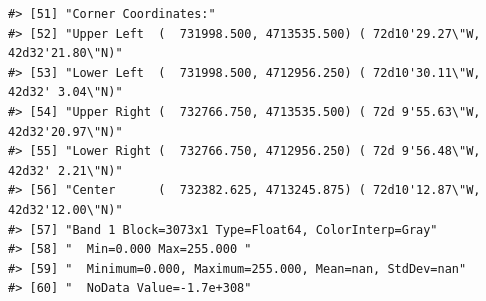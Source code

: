 \documentclass[
]{book}
\begin{document}
\begin{verbatim}
#> [51] "Corner Coordinates:"                                                                                                                                                                                                                                                            
#> [52] "Upper Left  (  731998.500, 4713535.500) ( 72d10'29.27\"W, 42d32'21.80\"N)"                                                                                                                                                                                                      
#> [53] "Lower Left  (  731998.500, 4712956.250) ( 72d10'30.11\"W, 42d32' 3.04\"N)"                                                                                                                                                                                                      
#> [54] "Upper Right (  732766.750, 4713535.500) ( 72d 9'55.63\"W, 42d32'20.97\"N)"                                                                                                                                                                                                      
#> [55] "Lower Right (  732766.750, 4712956.250) ( 72d 9'56.48\"W, 42d32' 2.21\"N)"                                                                                                                                                                                                      
#> [56] "Center      (  732382.625, 4713245.875) ( 72d10'12.87\"W, 42d32'12.00\"N)"                                                                                                                                                                                                      
#> [57] "Band 1 Block=3073x1 Type=Float64, ColorInterp=Gray"                                                                                                                                                                                                                             
#> [58] "  Min=0.000 Max=255.000 "                                                                                                                                                                                                                                                       
#> [59] "  Minimum=0.000, Maximum=255.000, Mean=nan, StdDev=nan"                                                                                                                                                                                                                         
#> [60] "  NoData Value=-1.7e+308"                                                                                                                                                                                                                                                       

\end{verbatim}
\end{document}
